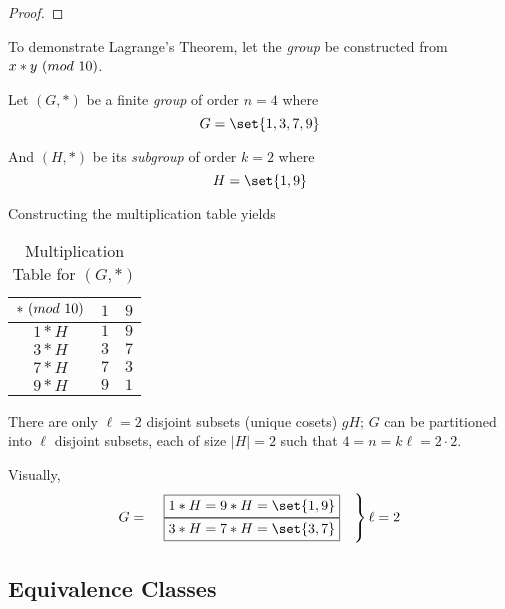 \begin{proof}
\end{proof}

\begin{remark}
    To demonstrate Lagrange's Theorem, let the \textit{group} be constructed from $x \ast y \ (\relax{mod}\ 10)$.
    
    Let $(G, \ast)$ be a finite \textit{group} of order $n = 4$ where
    \begin{equation}
        G = \set{1, 3, 7, 9}
    \end{equation}
    
    And $(H, \ast)$ be its \textit{subgroup} of order $k = 2$ where
    \begin{equation}
        H = \set{1, 9}
    \end{equation}
    
    Constructing the multiplication table yields
    \begin{table}[H]
    \centering
    \begin{tabular}{c | c c}
    \toprule
    $\ast \ (\relax{mod}\ 10)$ & $1$ & $9$ \\
     \midrule
    $1 \ast H$       & $1$ & $9$ \\
    $3 \ast H$       & $3$ & $7$ \\
    $7 \ast H$       & $7$ & $3$ \\
    $9 \ast H$       & $9$ & $1$ \\ 
    \bottomrule
    \end{tabular}
    \caption{Multiplication Table for $(G, \ast)$}
    \end{table}
    
    There are only $\ell = 2$ disjoint subsets (unique cosets) $gH$; $G$ can be partitioned into $\ell$ disjoint subsets, each of size $\lvert H \rvert = 2$ such that $4 = n = k\ell = 2 \cdot 2$.
    
    Visually,
    \begin{equation}
        G = \left. \begin{matrix}
            &\boxed{1 \ast H = 9 \ast H = \set{1, 9}} \\
            &\boxed{3 \ast H = 7 \ast H = \set{3, 7}}
        \end{matrix} \quad \right\} \ell = 2
    \end{equation}
\end{remark}

\subsection{Equivalence Classes}

